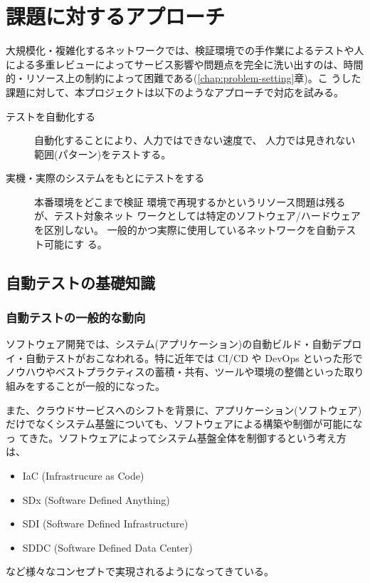 
\chapter{課題に対するアプローチ}
\label{chap:approach}


大規模化・複雑化するネットワークでは、検証環境での手作業によるテストや人
による多重レビューによってサービス影響や問題点を完全に洗い出すのは、時間
的・リソース上の制約によって困難である(\ref{chap:problem-setting}章)。こ
うした課題に対して、本プロジェクトは以下のようなアプローチで対応を試みる。
\begin{description}
 \item[テストを自動化する] 自動化することにより、人力ではできない速度で、
            人力では見きれない範囲(パターン)をテストする。
 \item[実機・実際のシステムをもとにテストをする] 本番環境をどこまで検証
            環境で再現するかというリソース問題は残るが、テスト対象ネット
            ワークとしては特定のソフトウェア/ハードウェアを区別しない。
            一般的かつ実際に使用しているネットワークを自動テスト可能にす
            る。
\end{description}


\section{自動テストの基礎知識}
\label{sec:latedge-test-automation}


  \subsection{自動テストの一般的な動向}
  \label{sec:popular-test-automation}

ソフトウェア開発では、システム(アプリケーション)の自動ビルド・自動デプロ
イ・自動テストがおこなわれる。特に近年では CI/CD や DevOps といった形で
ノウハウやベストプラクティスの蓄積・共有、ツールや環境の整備といった取り
組みをすることが一般的になった。

また、クラウドサービスへのシフトを背景に、アプリケーション(ソフトウェア)
だけでなくシステム基盤についても、ソフトウェアによる構築や制御が可能になっ
てきた。ソフトウェアによってシステム基盤全体を制御するという考え方は、
\begin{itemize}
 \item IaC (Infrastrucure as Code)
 \item SDx (Software Defined Anything)
 \item SDI (Software Defined Infrastructure)
 \item SDDC (Software Defined Data Center)
\end{itemize}
など様々なコンセプトで実現されるようになってきている。

